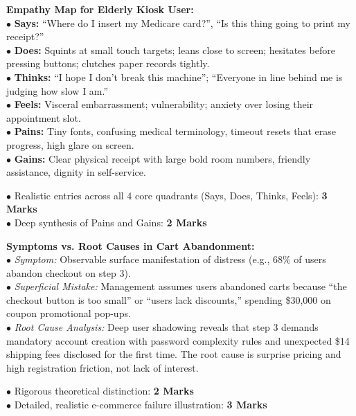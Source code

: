 \begin{solutionbox}
\textbf{Empathy Map for Elderly Kiosk User:}\\
$\bullet$ \textbf{Says:} ``Where do I insert my Medicare card?'', ``Is this thing going to print my receipt?''\\
$\bullet$ \textbf{Does:} Squints at small touch targets; leans close to screen; hesitates before pressing buttons; clutches paper records tightly.\\
$\bullet$ \textbf{Thinks:} ``I hope I don't break this machine''; ``Everyone in line behind me is judging how slow I am.''\\
$\bullet$ \textbf{Feels:} Visceral embarrassment; vulnerability; anxiety over losing their appointment slot.\\
$\bullet$ \textbf{Pains:} Tiny fonts, confusing medical terminology, timeout resets that erase progress, high glare on screen.\\
$\bullet$ \textbf{Gains:} Clear physical receipt with large bold room numbers, friendly assistance, dignity in self-service.
\begin{markingrubric}
$\bullet$ Realistic entries across all 4 core quadrants (Says, Does, Thinks, Feels): \textbf{3 Marks}\\
$\bullet$ Deep synthesis of Pains and Gains: \textbf{2 Marks}
\end{markingrubric}
\end{solutionbox}

\begin{solutionbox}
\textbf{Symptoms vs. Root Causes in Cart Abandonment:}\\
$\bullet$ \textit{Symptom:} Observable surface manifestation of distress (e.g., 68\% of users abandon checkout on step 3).\\
$\bullet$ \textit{Superficial Mistake:} Management assumes users abandoned carts because ``the checkout button is too small'' or ``users lack discounts,'' spending \$30,000 on coupon promotional pop-ups.\\
$\bullet$ \textit{Root Cause Analysis:} Deep user shadowing reveals that step 3 demands mandatory account creation with password complexity rules and unexpected \$14 shipping fees disclosed for the first time. The root cause is surprise pricing and high registration friction, not lack of interest.
\begin{markingrubric}
$\bullet$ Rigorous theoretical distinction: \textbf{2 Marks}\\
$\bullet$ Detailed, realistic e-commerce failure illustration: \textbf{3 Marks}
\end{markingrubric}
\end{solutionbox}

